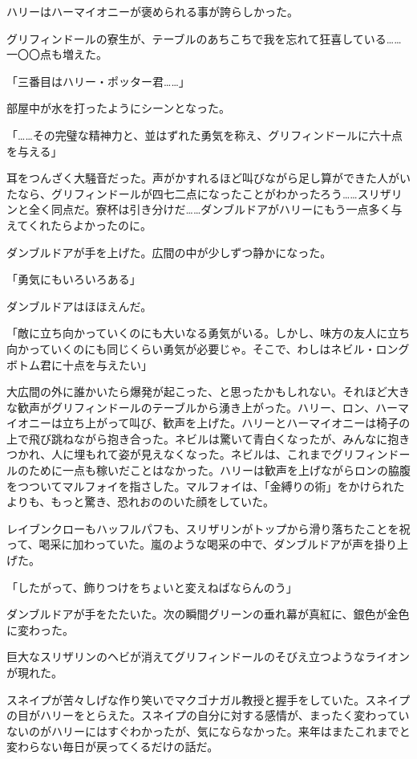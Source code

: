 \documentclass[10pt,a4paper]{article}
\begin{document}
\begin{CJK}{UTF8}{min}
ハリーはハーマイオニーが褒められる事が誇らしかった。

グリフィンドールの寮生が、テーブルのあちこちで我を忘れて狂喜している……一〇〇点も増えた。

「三番目はハリー・ポッター君……」

部屋中が水を打ったようにシーンとなった。

「……その完璧な精神力と、並はずれた勇気を称え、グリフィンドールに六十点を与える」

耳をつんざく大騒音だった。声がかすれるほど叫びながら足し算ができた人がいたなら、グリフィンドールが四七二点になったことがわかったろう……スリザリンと全く同点だ。寮杯は引き分けだ……ダンブルドアがハリーにもう一点多く与えてくれたらよかったのに。

ダンブルドアが手を上げた。広間の中が少しずつ静かになった。

「勇気にもいろいろある」

ダンブルドアはほほえんだ。

「敵に立ち向かっていくのにも大いなる勇気がいる。しかし、味方の友人に立ち向かっていくのにも同じくらい勇気が必要じゃ。そこで、わしはネビル・ロングボトム君に十点を与えたい」

大広間の外に誰かいたら爆発が起こった、と思ったかもしれない。それほど大きな歓声がグリフィンドールのテーブルから湧き上がった。ハリー、ロン、ハーマイオニーは立ち上がって叫び、歓声を上げた。ハリーとハーマイオニーは椅子の上で飛び跳ねながら抱き合った。ネビルは驚いて青白くなったが、みんなに抱きつかれ、人に埋もれて姿が見えなくなった。ネビルは、これまでグリフィンドールのために一点も稼いだことはなかった。ハリーは歓声を上げながらロンの脇腹をつついてマルフォイを指さした。マルフォイは、「金縛りの術」をかけられたよりも、もっと驚き、恐れおののいた顔をしていた。

レイブンクローもハッフルパフも、スリザリンがトップから滑り落ちたことを祝って、喝采に加わっていた。嵐のような喝采の中で、ダンブルドアが声を掛り上げた。

「したがって、飾りつけをちょいと変えねばならんのう」

ダンブルドアが手をたたいた。次の瞬間グリーンの垂れ幕が真紅に、銀色が金色に変わった。

巨大なスリザリンのヘビが消えてグリフィンドールのそびえ立つようなライオンが現れた。

スネイプが苦々しげな作り笑いでマクゴナガル教授と握手をしていた。スネイプの目がハリーをとらえた。スネイプの自分に対する感情が、まったく変わっていないのがハリーにはすぐわかったが、気にならなかった。来年はまたこれまでと変わらない毎日が戻ってくるだけの話だ。


\end{CJK}
\end{document}

